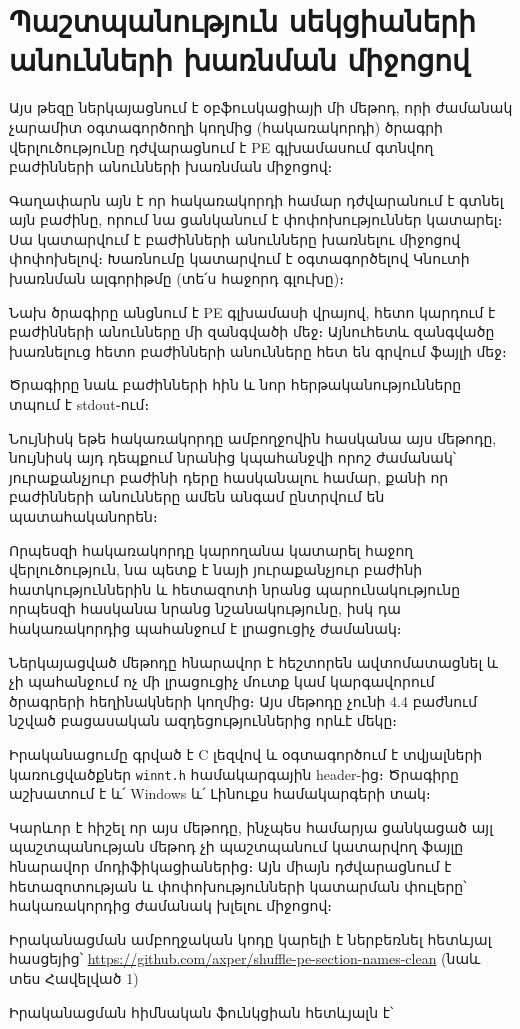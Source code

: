 \documentclass[12pt]{article}
\begin{document}
\begin{sloppypar}
\section{Պաշտպանություն սեկցիաների անունների խառնման միջոցով}
Այս թեզը ներկայացնում է օբֆուսկացիայի մի մեթոդ, որի ժամանակ չարամիտ
օգտագործողի կողմից (հակառակորդի) ծրագրի վերլուծությունը դժվարացնում է
PE գլխամասում գտնվող բաժինների անունների խառնման միջոցով։

Գաղափարն այն է որ հակառակորդի համար դժվարանում է գտնել այն բաժինը, որում
նա ցանկանում է փոփոխություններ կատարել։ Սա կատարվում է բաժինների անունները
խառնելու միջոցով փոփոխելով։ Խառնումը կատարվում է օգտագործելով Կնուտի խառնման
ալգորիթմը (տե՛ս հաջորդ գլուխը)։

Նախ ծրագիրը անցնում է PE գլխամասի վրայով, հետո կարդում է բաժինների անունները
մի զանգվածի մեջ։ Այնուհետև զանգվածը խառնելուց հետո բաժինների անունները հետ
են գրվում ֆայլի մեջ։

Ծրագիրը նաև բաժինների հին և նոր հերթականությունները տպում է stdout֊ում։

Նույնիսկ եթե հակառակորդը ամբողջովին հասկանա այս մեթոդը, նույնիսկ այդ դեպքում
նրանից կպահանջվի որոշ ժամանակ՝ յուրաքանչյուր բաժինի դերը հասկանալու համար,
քանի որ բաժինների անունները ամեն անգամ ընտրվում են պատահականորեն։

Որպեսզի հակառակորդը կարողանա կատարել հաջող վերլուծություն, նա պետք է
նայի յուրաքանչյուր բաժինի հատկություններին և հետազոտի նրանց պարունակությունը
որպեսզի հասկանա նրանց նշանակությունը, իսկ դա հակառակորդից պահանջում է
լրացուցիչ ժամանակ։

Ներկայացված մեթոդը հնարավոր է հեշտորեն ավտոմատացնել և չի պահանջում ոչ մի
լրացուցիչ մուտք կամ կարգավորում ծրագրերի հեղինակների կողմից։ Այս մեթոդը չունի
4.4 բաժնում նշված բացասական ազդեցություններից որևէ մեկը։

Իրականացումը գրված է C լեզվով և օգտագործում է տվյալների կառուցվածքներ
\texttt{winnt.h} համակարգային header-ից։ Ծրագիրը աշխատում է և՛ Windows և՛
Լինուքս համակարգերի տակ։

Կարևոր է հիշել որ այս մեթոդը, ինչպես համարյա ցանկացած այլ
պաշտպանության մեթոդ չի պաշտպանում կատարվող ֆայլը հնարավոր մոդիֆիկացիաներից։
Այն միայն դժվարացնում է հետազոտության և փոփոխությունների կատարման փուլերը՝
հակառակորդից ժամանակ խլելու միջոցով։

Իրականացման ամբողջական կոդը կարելի է ներբեռնել հետևյալ հասցեյից՝
\url{https://github.com/axper/shuffle-pe-section-names-clean}
(նաև տես Հավելված 1)

Իրականացման հիմնական ֆունկցիան հետևյալն է՝


\end{sloppypar}
\end{document}
